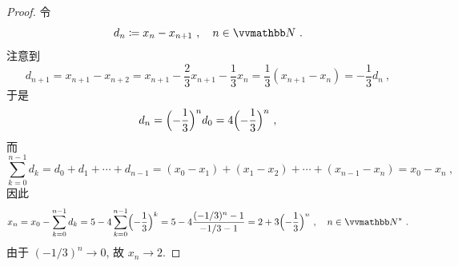 \begin{proof}
    令
    \[
        d_n \coloneqq x_n - x_{n + 1}\ ,\quad n \in \N\ .
    \]
    注意到
    \[
        d_{n + 1} = x_{n + 1} - x_{n + 2} = x_{n + 1} - \frac{2}{3} x_{n + 1} - \frac{1}{3} x_n = \frac{1}{3} (x_{n + 1} - x_n) = - \frac{1}{3} d_{n}\ ,
    \]
    于是
    \[
        d_n = \Bigl(- \frac{1}{3}\Bigr)^n d_0 = 4 \Bigl(- \frac{1}{3}\Bigr)^n\ ,
    \]
    而
    \[
        \sum_{k = 0}^{n - 1} d_k = d_0 + d_1 + \cdots + d_{n - 1} = (x_0 - x_1) + (x_1 - x_2) + \cdots + (x_{n - 1} - x_n) = x_0 - x_n\ ,
    \]
    因此
    \[
        x_n = x_0 - \sum_{k = 0}^{n - 1} d_k = 5 - 4 \sum_{k = 0}^{n - 1} \Bigl(- \frac{1}{3}\Bigr)^k = 5 - 4 \frac{(- 1 / 3)^n - 1}{- 1 / 3 - 1} = 2 + 3 \Bigl(- \frac{1}{3}\Bigr)^n\ ,\quad n \in \N^\ast\ .
    \]
    由于 \((- 1 / 3)^n \to 0\), 故 \(x_n \to 2\).
\end{proof}

